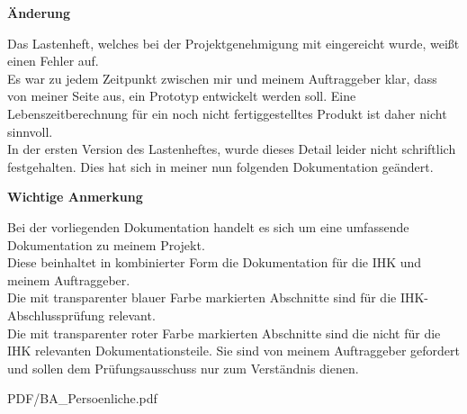 \vspace{2cm}

\begin{center}
\begin{Huge}
\textbf{Änderung}
\end{Huge}
\end{center}
Das Lastenheft, welches bei der Projektgenehmigung mit eingereicht wurde, weißt einen Fehler auf. 
\\
Es war zu jedem Zeitpunkt zwischen mir und meinem Auftraggeber klar, dass von meiner Seite aus, ein Prototyp entwickelt werden soll. Eine Lebenszeitberechnung für ein noch nicht fertiggestelltes Produkt ist daher nicht sinnvoll.
\\
In der ersten Version des Lastenheftes, wurde dieses Detail leider nicht schriftlich festgehalten. Dies hat sich in meiner nun folgenden Dokumentation geändert.



\vspace{5cm}

\begin{Huge}
\begin{center}
\textbf{Wichtige Anmerkung}
\end{center}
\end{Huge}
Bei der vorliegenden Dokumentation handelt es sich um eine umfassende Dokumentation zu meinem Projekt. 
\\
Diese beinhaltet in kombinierter Form die Dokumentation für die IHK und meinem Auftraggeber.
\\
Die mit transparenter blauer Farbe markierten Abschnitte sind für die IHK-Abschlussprüfung relevant. 
\\
Die mit transparenter roter Farbe markierten Abschnitte sind die nicht für die IHK relevanten Dokumentationsteile. Sie sind von meinem Auftraggeber gefordert und sollen dem Prüfungsausschuss nur zum Verständnis dienen.

\newpage

 {PDF/BA_Persoenliche.pdf}



